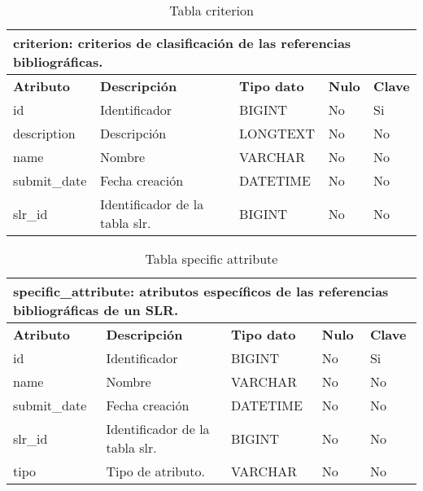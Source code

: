 \begin{table}[!hbt]
	\begin{center}
		\begin{tabular}{|p{3cm}|p{4cm}|p{4cm}|p{2cm}|p{2cm}|}
			\hline
			\multicolumn{5}{|l|}{\textbf{criterion:} criterios de clasificación de las referencias bibliográficas.} \\
			\hline
			\hline
			\textbf{Atributo} & \textbf{Descripción} & \textbf{Tipo dato} & \textbf{Nulo} & \textbf{Clave}\\
			\hline
			id & Identificador  & BIGINT & No & Si\\
			\hline
			description & Descripción & LONGTEXT & No & No\\
			\hline
			name & Nombre & VARCHAR & No & No\\
			\hline
			submit\_date & Fecha creación & DATETIME & No & No\\
			\hline
			slr\_id & Identificador de la tabla slr. & BIGINT & No & No\\
			\hline
		\end{tabular}
		\caption{Tabla criterion}
		\label{table:db-criterion}
	\end{center}
\end{table}

\begin{table}[!hbt]
	\begin{center}
		\begin{tabular}{|p{3cm}|p{4cm}|p{4cm}|p{2cm}|p{2cm}|}
			\hline
			\multicolumn{5}{|l|}{\textbf{specific\_attribute:} atributos específicos de las referencias bibliográficas de un SLR.} \\
			\hline
			\hline
			\textbf{Atributo} & \textbf{Descripción} & \textbf{Tipo dato} & \textbf{Nulo} & \textbf{Clave}\\
			\hline
			id & Identificador  & BIGINT & No & Si\\
			\hline
			name & Nombre & VARCHAR & No & No\\
			\hline
			submit\_date & Fecha creación & DATETIME & No & No\\
			\hline
			slr\_id & Identificador de la tabla slr. & BIGINT & No & No\\
			\hline
			tipo & Tipo de atributo. & VARCHAR & No & No\\
			\hline
		\end{tabular}
		\caption{Tabla specific attribute}
		\label{table:db-specattribute}
	\end{center}
\end{table}

